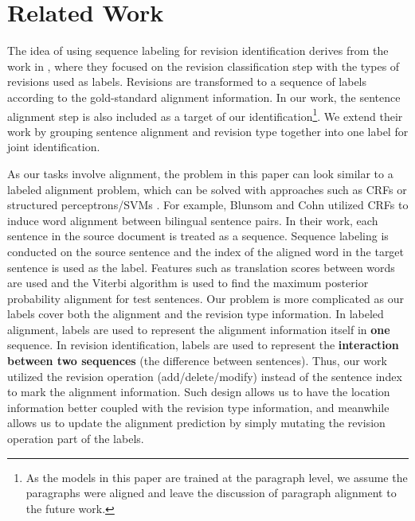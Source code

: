 \documentclass[11pt]{article}
\begin{document}
\section{Related Work}
The idea of using sequence labeling for revision identification derives from the work in \cite{zhang-litman:2016:N16-1}, where they focused on the revision classification step with the types of revisions used as labels. Revisions are transformed to a sequence of labels according to the gold-standard alignment information. In our work, the sentence alignment step is also included as a target of our identification\footnote{As the models in this paper are trained at the paragraph level, we assume the paragraphs were aligned and leave the discussion of paragraph alignment to the future work.}. We extend their work by grouping sentence alignment and revision type together into one label for joint identification.

As our tasks involve alignment, the problem in this paper can look similar to a labeled alignment problem, which can be solved with approaches such as CRFs \cite{blunsom2006discriminative} or structured perceptrons/SVMs \cite{moore2006improved}. For example, Blunsom and Cohn  utilized CRFs to induce word alignment between bilingual sentence pairs. In their work, each sentence in the source document is treated as a sequence. Sequence labeling is conducted on the source sentence and the index of the aligned word in the target sentence is used as the label. Features such as translation scores between words are used and the Viterbi algorithm is used to find the maximum posterior probability alignment for test sentences. Our problem is more complicated as our labels cover both the alignment and the revision type information. In labeled alignment, labels are used to represent the alignment information itself in \textbf{one} sequence. In revision identification, labels are used to represent the \textbf{interaction between two sequences} (the difference between sentences). Thus, our work utilized the revision operation (add/delete/modify) instead of the sentence index to mark the alignment information. Such design allows us to have the location information better coupled with the revision type information, and meanwhile allows us to update the alignment prediction by simply mutating the revision operation part of the labels.
\end{document}
